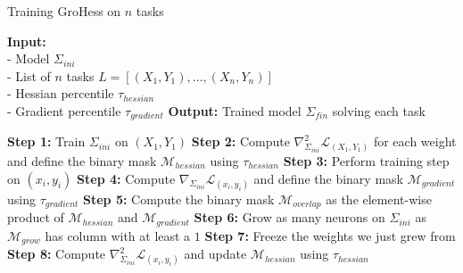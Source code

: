 \documentclass[11pt]{article}
\begin{document}
\begin{algorithm*}
    \caption{Training GroHess on $n$ tasks}
    \begin{algorithmic}[1]
    \State \textbf{Input:} \\
    - Model $\Sigma_{ini}$ \\ 
    - List of $n$ tasks $L = [(X_1,Y_1), \ldots, (X_n,Y_n)]$\\
    - Hessian percentile $\tau_{hessian}$ \\
    - Gradient percentile $\tau_{gradient}$
    \State \textbf{Output:} Trained model $\Sigma_{fin}$ solving each task
    \State
    
    \State \textbf{Step 1:} Train $\Sigma_{ini}$ on $(X_1,Y_1)$
    \State \textbf{Step 2:} Compute $\nabla^2_{\Sigma_{ini}} \mathcal{L}_{(X_1,Y_1)}$ for each weight and define the binary mask $\mathcal{M}_{hessian}$ using $\tau_{hessian}$  
            \State \textbf{Step 3:} Perform training step on $(x_i,y_i)$
                \State \textbf{Step 4:} Compute $\nabla_{\Sigma_{ini}} \mathcal{L}_{(x_i,y_i)}$ and define the binary mask $\mathcal{M}_{gradient}$ using $\tau_{gradient}$
                \State \textbf{Step 5:} Compute the binary mask $\mathcal{M}_{overlap}$ as the element-wise product of $\mathcal{M}_{hessian}$ and $\mathcal{M}_{gradient}$
                \State \textbf{Step 6:} Grow as many neurons on $\Sigma_{ini}$ as $\mathcal{M}_{grow}$ has column with at least a $1$
                \State \textbf{Step 7:} Freeze the weights we just grew from
            \EndIf
        \EndFor
        \State \textbf{Step 8:} Compute $\nabla^2_{\Sigma_{ini}} \mathcal{L}_{(x_i,y_i)}$ and update $\mathcal{M}_{hessian}$ using $\tau_{hessian}$
    \EndFor
    \end{algorithmic}
\end{algorithm*}
\end{document}
